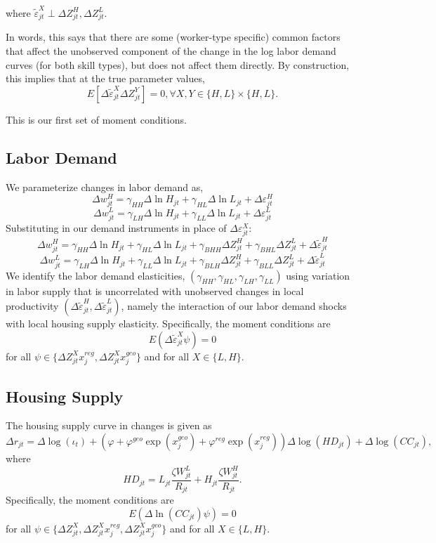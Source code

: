 \documentclass{article}
\begin{document}
 where $\tilde{\varepsilon}_{jt}^X \perp \Delta Z_{jt}^H, \Delta Z_{jt}^L$.

 In words, this says that there are some (worker-type specific) common factors  that affect the unobserved  component of the change in the log labor demand curves (for both skill types), but does not affect them directly. By construction, this implies that at the true parameter values, $$E[\Delta \tilde\varepsilon_{jt}^X \Delta Z_{jt}^Y]=0, \forall X,Y \in \{H,L\} \times \{H,L\}.$$ 

 This is our first set of moment conditions. 

 \subsection{Labor Demand}

 We parameterize changes in labor demand as,
 $$\Delta w_{jt}^H = \gamma_{HH} \Delta \ln H_{jt} + \gamma_{HL}\Delta \ln L_{jt} + \Delta \varepsilon_{jt}^H$$
$$\Delta w_{jt}^L = \gamma_{LH} \Delta \ln H_{jt} + \gamma_{LL}\Delta \ln L_{jt} + \Delta \varepsilon_{jt}^L$$
Substituting in our demand instruments in place of $\Delta\varepsilon_{jt}^X$:
 $$\Delta w_{jt}^H = \gamma_{HH} \Delta \ln H_{jt} + \gamma_{HL}\Delta \ln L_{jt} + \gamma_{BHH}\Delta Z_{jt}^H  + \gamma_{BHL}\Delta Z_{jt}^L +\Delta \tilde{\varepsilon}_{jt}^H$$
$$\Delta w_{jt}^L = \gamma_{LH} \Delta \ln H_{jt} + \gamma_{LL}\Delta \ln L_{jt} + \gamma_{BLH}\Delta Z_{jt}^H  + \gamma_{BLL}\Delta Z_{jt}^L +\Delta \tilde{\varepsilon}_{jt}^L$$
We identify the labor demand elasticities, $(\gamma_{HH}, \gamma_{HL}, \gamma_{LH}, \gamma_{LL})$ using variation in labor supply that is uncorrelated with unobserved changes in local productivity $(\Delta\tilde{\varepsilon}_{jt}^H, \Delta\tilde{\varepsilon}_{jt}^L)$, namely the interaction of our labor demand shocks with local housing supply elasticity. Specifically, the moment conditions are
$$E(\Delta\tilde{\varepsilon}_{jt}^X \psi) = 0$$
for all $\psi \in \{\Delta Z_{jt}^X x_j^{reg}, \Delta Z_{jt}^X x_j^{geo}\}$ and for all $X\in\{L,H\}$.

\subsection{Housing Supply}

The housing supply curve in changes is given as 
$$
\Delta r_{jt} = \Delta \log( \iota_t )+ (\varphi + \varphi^{geo}\exp(x_j^{geo}) + \varphi^{reg}\exp(x^{reg}_j))\Delta \log (HD_{jt}) + \Delta \log(CC_{jt}),
$$
where 
$$
HD_{jt} = L_{jt} \frac{\zeta W^L_{jt}}{R_{jt}} + H_{jt} \frac{\zeta W^H_{jt}}{R_{jt}} .
$$
Specifically, the moment conditions are 
$$
E(\Delta \ln (CC_{jt}) \psi) = 0 
$$
for all $\psi \in \{\Delta Z^X_{jt}, \Delta Z_{jt}^X x_j^{reg}, \Delta Z_{jt}^X x_j^{geo}\}$ and for all $X\in\{L,H\}$.
\end{document}
